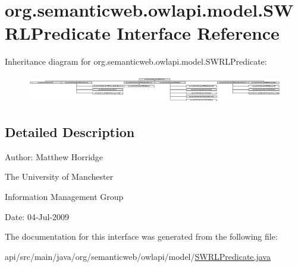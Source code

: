 \hypertarget{interfaceorg_1_1semanticweb_1_1owlapi_1_1model_1_1_s_w_r_l_predicate}{\section{org.\-semanticweb.\-owlapi.\-model.\-S\-W\-R\-L\-Predicate Interface Reference}
\label{interfaceorg_1_1semanticweb_1_1owlapi_1_1model_1_1_s_w_r_l_predicate}
}
Inheritance diagram for org.\-semanticweb.\-owlapi.\-model.\-S\-W\-R\-L\-Predicate\-:\begin{figure}[H]
\begin{center}
\leavevmode
\includegraphics[height=1.218905cm]{interfaceorg_1_1semanticweb_1_1owlapi_1_1model_1_1_s_w_r_l_predicate}
\end{center}
\end{figure}


\subsection{Detailed Description}
Author\-: Matthew Horridge\par
 The University of Manchester\par
 Information Management Group\par
 Date\-: 04-\/\-Jul-\/2009 

The documentation for this interface was generated from the following file\-:\begin{DoxyCompactItemize}
\item 
api/src/main/java/org/semanticweb/owlapi/model/\hyperlink{_s_w_r_l_predicate_8java}{S\-W\-R\-L\-Predicate.\-java}\end{DoxyCompactItemize}
